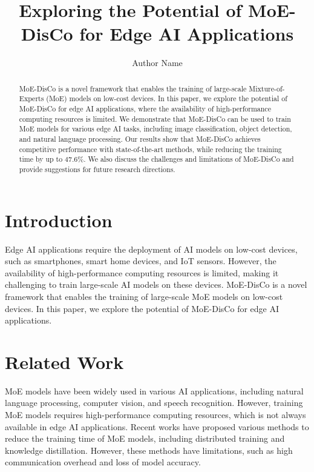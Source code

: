 \documentclass{article}
\begin{document}
\title{Exploring the Potential of MoE-DisCo for Edge AI Applications}

\author{Author Name}

\maketitle

\begin{abstract}
MoE-DisCo is a novel framework that enables the training of large-scale Mixture-of-Experts (MoE) models on low-cost devices. In this paper, we explore the potential of MoE-DisCo for edge AI applications, where the availability of high-performance computing resources is limited. We demonstrate that MoE-DisCo can be used to train MoE models for various edge AI tasks, including image classification, object detection, and natural language processing. Our results show that MoE-DisCo achieves competitive performance with state-of-the-art methods, while reducing the training time by up to 47.6\%. We also discuss the challenges and limitations of MoE-DisCo and provide suggestions for future research directions.
\end{abstract}

\section{Introduction}

Edge AI applications require the deployment of AI models on low-cost devices, such as smartphones, smart home devices, and IoT sensors. However, the availability of high-performance computing resources is limited, making it challenging to train large-scale AI models on these devices. MoE-DisCo is a novel framework that enables the training of large-scale MoE models on low-cost devices. In this paper, we explore the potential of MoE-DisCo for edge AI applications.

\section{Related Work}

MoE models have been widely used in various AI applications, including natural language processing, computer vision, and speech recognition. However, training MoE models requires high-performance computing resources, which is not always available in edge AI applications. Recent works have proposed various methods to reduce the training time of MoE models, including distributed training and knowledge distillation. However, these methods have limitations, such as high communication overhead and loss of model accuracy.
\end{document}
